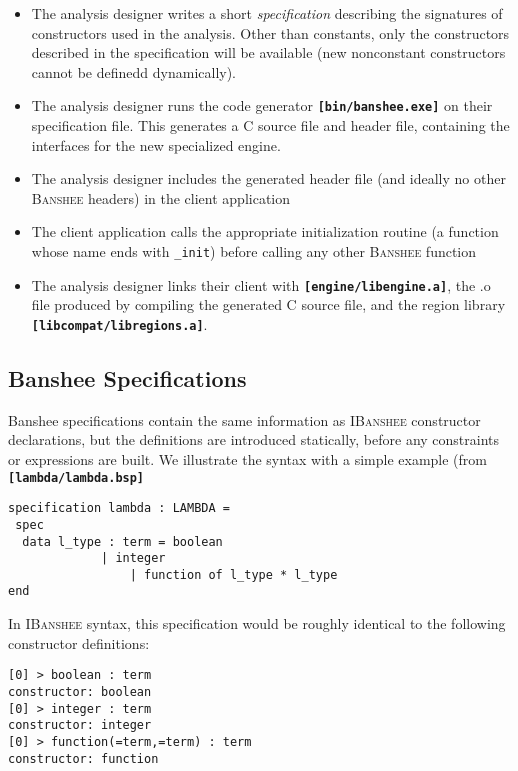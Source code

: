 \documentclass[10pt]{article}
\newcommand{\banshee}{\textsc{Banshee}}
\newcommand{\ibanshee}{\textsc{IBanshee}}
\newcommand{\file}[1]{\texttt{\textbf{[#1]}}}
\begin{document}
\begin{itemize}
\item The analysis designer writes a short \emph{specification}
  describing the signatures of constructors used in the
  analysis. Other than constants, only the constructors described in
  the specification will be available (new nonconstant constructors
  cannot be definedd dynamically).
\item The analysis designer runs the code generator
  \file{bin/banshee.exe} on their specification file. This generates a
  C source file and header file, containing the interfaces for the new
  specialized engine. 
\item The analysis designer includes the generated header file (and
  ideally no other \banshee{} headers) in the client application
\item The client application calls the appropriate initialization
  routine (a function whose name ends with \texttt{\_init}) before
  calling any other \banshee{} function
\item The analysis designer links their client with
  \file{engine/libengine.a}, the .o file produced by compiling the
  generated C source file, and the region library
  \file{libcompat/libregions.a}.
\end{itemize}

\subsection{Banshee Specifications}

Banshee specifications contain the same information as \ibanshee{}
constructor declarations, but the definitions are introduced
statically, before any constraints or expressions are built. We
illustrate the syntax with a simple example (from
\file{lambda/lambda.bsp}

\begin{verbatim}
specification lambda : LAMBDA =
 spec
  data l_type : term = boolean
		     | integer
	             | function of l_type * l_type
end
\end{verbatim}

In \ibanshee{} syntax, this specification would be roughly identical
to the following constructor definitions:

\begin{verbatim}
[0] > boolean : term
constructor: boolean
[0] > integer : term
constructor: integer
[0] > function(=term,=term) : term
constructor: function
\end{verbatim}
\end{document}
